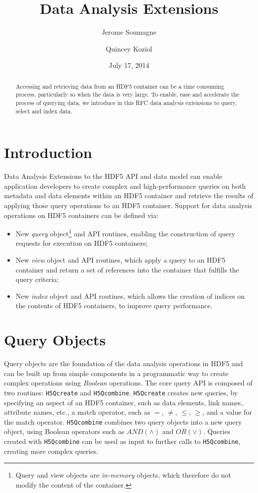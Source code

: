 \documentclass[letterpaper,hyper]{THG_RFC}
\title{Data Analysis Extensions}
\author{Jerome Soumagne}
\author{Quincey Koziol}
\date{July 17, 2014}
\begin{document}
\maketitle

\begin{abstract}
Accessing and retrieving data from an HDF5 container can be a time consuming
process, particularly so when the data is very large. To enable,
ease and accelerate the process of querying data, we introduce in this RFC data
analysis extensions to query, select and index data.
\end{abstract}

\section{Introduction}
Data Analysis Extensions to the HDF5 API and data model can enable application
developers to create complex and high-performance queries on both metadata and
data elements within an HDF5 container and retrieve the results of applying
those query operations to an HDF5 container.
Support for data analysis operations on HDF5 containers can be defined via:
\begin{itemize}
\item New \textit{query} object\footnote{Query and view objects are
\textit{in-memory} objects, which therefore do not modify the content of the
container.\label{fn:object}} and API routines, enabling the construction of
query requests for execution on HDF5 containers;
\item New \textit{view} object and API routines, which apply a query to an HDF5
container and return a set of references into the container that fulfills
the query criteria;
\item New \textit{index} object and API routines, which allows the creation of
indices on the contents of HDF5 containers, to improve query performance.
\end{itemize}

\section{Query Objects}
Query objects are the foundation of the data analysis operations in HDF5 and
can be built up from simple components in a programmatic way to create complex
operations using \textit{Boolean} operations. The core query API is composed of
two routines: \texttt{H5Qcreate} and \texttt{H5Qcombine}. \texttt{H5Qcreate}
creates new queries, by specifying an aspect of an HDF5 container, such as
data elements, link names, attribute names, etc., a match operator, such as
$=$, $\neq$, $\leq$, $\geq$, and a value for the match operator.
\texttt{H5Qcombine} combines two query objects into a
new query object, using Boolean operators such as $AND(\land)$ and $OR(\lor)$.
Queries created with \texttt{H5Qcombine} can be used as input to further
calls to \texttt{H5Qcombine}, creating more complex queries.
\end{document}
